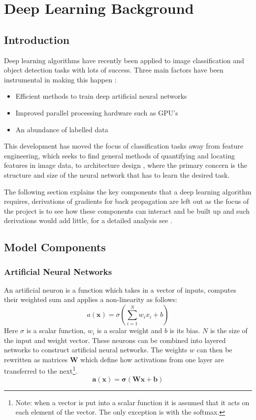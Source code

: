 \chapter{Deep Learning Background} \label{chapter:deep}
  \section{Introduction}
    Deep learning algorithms have recently been applied to image classification
    and object detection tasks with lots of success. \cite{Girshick2014,Krizhevsky2012}
    Three main factors have been instrumental in making this happen \cite{Jaiswal2016}:
    \begin{itemize}
      \item Efficient methods to train deep artificial neural networks
      \item Improved parallel processing hardware such as GPU's
      \item An abundance of labelled data
    \end{itemize}
    This development has moved the focus of classification tasks away from feature engineering,
    which seeks to find general methods of quantifying and locating features in image data, to
    architecture design \cite{StephenMerity2016}, where the primary concern is the structure and size of the neural network that has to
    learn the desired task.

    The following section explains the key components that a deep learning algorithm requires,
    derivations of gradients for back propagation are left out as the focus of the project is to
    see how these components can interact and be built up and such derivations would add little,
    for a detailed analysis see \cite{Bishop1995}.
  \section{Model Components}
    \subsection{Artificial Neural Networks}
      An artificial neuron is a function which takes in a vector of inputs, computes their
      weighted sum and applies a non-linearity as follows:
      \begin{equation}
        a(\mathbf{x}) = \sigma \left ( \sum_{i=1}^N w_ix_i + b \right )
      \end{equation}
      Here $\sigma$ is a scalar function, $w_i$ is a scalar weight and $b$ is its bias. $N$ is the size of the input and weight vector.
      These neurons can be combined into layered networks to construct artificial neural networks.
      The weights $w$ can then be rewritten as matrices $\mathbf{W}$ which define how
      activations from one layer are transferred to the next\footnote{Note: when a vector
      is put into a scalar function it is assumed that it acts on each element of
      the vector. The only exception is with the softmax.}.
      \begin{equation}
        \mathbf{a}(\mathbf{x}) = \mathbf{\sigma} \left ( \mathbf{W}\mathbf{x} + \mathbf{b} \right ) \label{eq:softmax}
      \end{equation}

